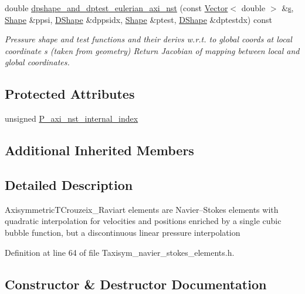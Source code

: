 \begin{DoxyCompactItemize}
double \hyperlink{classoomph_1_1AxisymmetricTCrouzeixRaviartElement_af257076318be5297b3e740ea42552fc5}{dpshape\+\_\+and\+\_\+dptest\+\_\+eulerian\+\_\+axi\+\_\+nst} (const \hyperlink{classoomph_1_1Vector}{Vector}$<$ double $>$ \&\hyperlink{cfortran_8h_ab7123126e4885ef647dd9c6e3807a21c}{s}, \hyperlink{classoomph_1_1Shape}{Shape} \&ppsi, \hyperlink{classoomph_1_1DShape}{D\+Shape} \&dppsidx, \hyperlink{classoomph_1_1Shape}{Shape} \&ptest, \hyperlink{classoomph_1_1DShape}{D\+Shape} \&dptestdx) const
\begin{DoxyCompactList}\small\item\em Pressure shape and test functions and their derivs w.\+r.\+t. to global coords at local coordinate s (taken from geometry) Return Jacobian of mapping between local and global coordinates. \end{DoxyCompactList}\end{DoxyCompactItemize}
\subsection*{Protected Attributes}
\begin{DoxyCompactItemize}
\item 
unsigned \hyperlink{classoomph_1_1AxisymmetricTCrouzeixRaviartElement_a05fdb096aa13072e690e30337ff91ff6}{P\+\_\+axi\+\_\+nst\+\_\+internal\+\_\+index}
\end{DoxyCompactItemize}
\subsection*{Additional Inherited Members}


\subsection{Detailed Description}
Axisymmetric\+T\+Crouzeix\+\_\+\+Raviart elements are Navier--Stokes elements with quadratic interpolation for velocities and positions enriched by a single cubic bubble function, but a discontinuous linear pressure interpolation 

Definition at line 64 of file Taxisym\+\_\+navier\+\_\+stokes\+\_\+elements.\+h.



\subsection{Constructor \& Destructor Documentation}
\mbox{\label{classoomph_1_1AxisymmetricTCrouzeixRaviartElement_a0d98aaabc1f686dc26a6028c6d993dc3}} 
